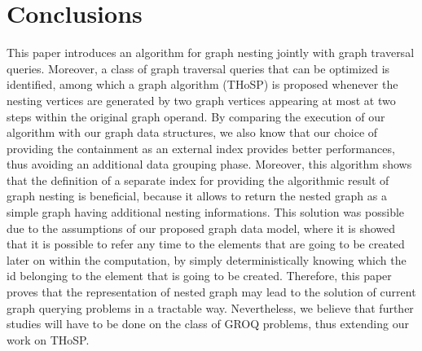 \section{Conclusions}
This paper introduces an algorithm for graph nesting jointly with graph traversal queries. Moreover, a class of graph traversal queries that can be optimized is identified, among which a graph algorithm (THoSP) is proposed whenever the nesting vertices are generated by two graph vertices appearing at most at two steps within the original graph operand. By comparing the execution of our algorithm with our graph data structures, we also know that our choice of providing the containment as an external index provides better performances, thus avoiding an additional data grouping phase. Moreover, this algorithm shows that the definition of a separate index for providing the algorithmic result of graph nesting is beneficial, because it allows to return the nested graph as a simple graph having additional nesting informations. This solution was possible due to the assumptions of our proposed graph data model, where it is showed that it is possible to refer any time to the elements that are going to be created later on within the computation, by simply deterministically knowing which the id belonging to the element that is going to be created.  Therefore, this paper proves that the representation of nested graph may lead to the solution of current graph querying problems in a tractable way. Nevertheless, we believe that further studies will have to be done on the class of  GROQ problems, thus extending our work on THoSP.